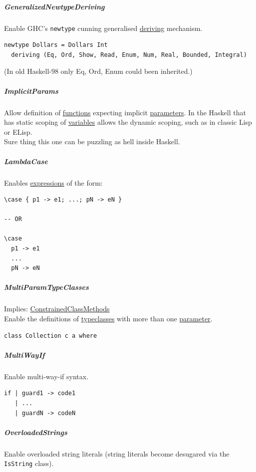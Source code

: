 \documentclass[11pt]{article}
\begin{document}
\subparagraph{\label{orgbe27bb6}GeneralizedNewtypeDeriving}
\label{sec:orgdcb6221}
Enable GHC’s \texttt{newtype} cunning generalised \hyperref[orgab79d7a]{deriving} mechanism.\\
\begin{verbatim}
newtype Dollars = Dollars Int
  deriving (Eq, Ord, Show, Read, Enum, Num, Real, Bounded, Integral)
\end{verbatim}
(In old Haskell-98 only Eq, Ord, Enum could been inherited.)\\

\subparagraph{\label{org2f5451a}ImplicitParams}
\label{sec:orgaf25e90}
Allow definition of \hyperref[orgaa8fb87]{functions} expecting implicit \hyperref[orgcafb058]{parameters}. In the Haskell that has static scoping of \hyperref[orge17f54f]{variables} allows the dynamic scoping, such as in classic Lisp or ELisp.\\
Sure thing this one can be puzzling as hell inside Haskell.\\

\subparagraph{\label{org473b6b3}LambdaCase}
\label{sec:orgaf3d92f}
Enables \hyperref[org3731c99]{expressions} of the form:\\
\begin{verbatim}
\case { p1 -> e1; ...; pN -> eN }

-- OR

\case
  p1 -> e1
  ...
  pN -> eN
\end{verbatim}

\subparagraph{\label{org01ca0be}MultiParamTypeClasses}
\label{sec:org9dbb24a}
Implies: \hyperref[orgddafd2d]{ConstrainedClassMethods}\\
Enable the definitions of \hyperref[orgfbc1bcf]{typeclasses} with more than one \hyperref[org0e7674e]{parameter}.\\
\begin{verbatim}
class Collection c a where
\end{verbatim}

\subparagraph{\label{org78a451d}MultiWayIf}
\label{sec:orgb19556b}
Enable multi-way-if syntax.\\
\begin{verbatim}
if | guard1 -> code1
   | ...
   | guardN -> codeN
\end{verbatim}

\subparagraph{\label{orgcd50d66}OverloadedStrings}
\label{sec:org9c72225}
Enable overloaded string literals (string literals become desugared via the \texttt{IsString} class).\\
\end{document}
